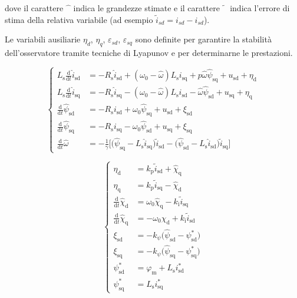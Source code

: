 \documentclass[11pt, a4paper]{scrartcl}
\numberwithin{equation}{section}
\begin{document}
\noindent
dove il carattere $\hat{\phantom{x}}$ indica le grandezze stimate e il carattere
$\tilde{\phantom{x}}$ indica l'errore di stima della relativa variabile
(ad esempio $\tilde{i}_{sd} = i_{sd} - \hat{i}_{sd}$).

\bigskip
\noindent
Le variabili ausiliarie $\eta_d$, $\eta_q$, $\varepsilon_{sd}$, $\varepsilon_{sq}$
sono definite per garantire la stabilità dell'osservatore tramite tecniche di Lyapunov
e per determinarne le prestazioni.

\begin{equation}
	\label{nlobs_pu_1}\left\lbrace 
	\begin{aligned}
		L_\text{s} \frac{\text{d}}{\text{d}t}\hat{i}_\text{sd} &= -R_\text{s} \hat{i}_\text{sd}+\left( \omega_0-\hat{\omega}\right)L_\text{s}i_\text{sq} + 
		p \hat{\omega}\hat{\psi}_\text{sq}+u_\text{sd}+\eta_\text{d} \\[6pt]
		L_\text{s} \frac{\text{d}}{\text{d}t}\hat{i}_\text{sq} &= -R_\text{s} \hat{i}_\text{sq}-\left( \omega_0-\hat{\omega}\right)L_\text{s}i_\text{sd} - 
		\hat{\omega}\hat{\psi}_\text{sd}+u_\text{sq}+\eta_\text{q} \\[6pt]	
		\frac{\text{d}}{\text{d}t}\hat{\psi}_\text{sd} &= -R_\text{s} i_\text{sd} + \omega_0\hat{\psi}_\text{sq} + u_\text{sd} + \xi_\text{sd}  \\[6pt]
		\frac{\text{d}}{\text{d}t}\hat{\psi}_\text{sq} &= -R_\text{s} i_\text{sq} - \omega_0\hat{\psi}_\text{sd} + u_\text{sq} + \xi_\text{sq}  \\[6pt]
		\frac{\text{d}}{\text{d}t}\hat{\omega} &= -\frac{1}{\gamma}\big[\big(\hat{\psi}_\text{sq} -L_\text{s}\hat{i}_\text{sq}\big)\tilde{i}_\text{sd} - \big(\hat{\psi}_\text{sd} -L_\text{s}\hat{i}_\text{sd}\big)\tilde{i}_\text{sq}\big]
	\end{aligned}\right. 
\end{equation}

\begin{equation}
	\label{nlobs_pu_1}\left\lbrace 
	\begin{aligned}
		\eta_\text{d} &= k_\text{p}\tilde{i}_\text{sd} + \hat{\chi}_\text{q} \\[6pt]
		\eta_\text{q} &= k_\text{p}\tilde{i}_\text{sq} - \hat{\chi}_\text{d} \\[6pt]
		\frac{\text{d}}{\text{d}t}\hat{\chi}_\text{d} &= \omega_0\hat{\chi}_\text{q} - 	k_\text{i}\tilde{i}_\text{sq}  \\[6pt]
		\frac{\text{d}}{\text{d}t}\hat{\chi}_\text{q} &= -\omega_0\hat{\chi}_\text{d} + 	k_\text{i}\tilde{i}_\text{sd}  \\[6pt]	
		\xi_\text{sd} &= -k_{\psi}\big(\hat{\psi}_\text{sd} - \psi_\text{sd}^\text{*}\big) \\[6pt]
		\xi_\text{sq} &= -k_{\psi}\big(\hat{\psi}_\text{sq} - \psi_\text{sq}^\text{*}\big) \\[6pt]
		\psi_\text{sd}^\text{*} &= \varphi_\text{m} + L_\text{s}i_\text{sd}^\text{*} \\[6pt]
		\psi_\text{sq}^\text{*} &= L_\text{s}i_\text{sq}^\text{*}
	\end{aligned}\right. 
\end{equation}
\end{document}

